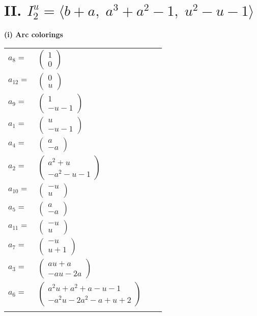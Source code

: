 \documentclass[1p]{elsarticle_modified}
\theoremstyle{definition}
\begin{document}
\centering \section*{II. $I^u_{2}= \langle b+a,\;a^3+a^2-1,\;u^2- u-1 \rangle$}
\flushleft \textbf{(i) Arc colorings}\\
\begin{tabular}{m{7pt} m{180pt} m{7pt} m{180pt} }
\flushright $a_{8}=$&$\begin{pmatrix}1\\0\end{pmatrix}$ \\
\flushright $a_{12}=$&$\begin{pmatrix}0\\u\end{pmatrix}$ \\
\flushright $a_{9}=$&$\begin{pmatrix}1\\- u-1\end{pmatrix}$ \\
\flushright $a_{1}=$&$\begin{pmatrix}u\\- u-1\end{pmatrix}$ \\
\flushright $a_{4}=$&$\begin{pmatrix}a\\- a\end{pmatrix}$ \\
\flushright $a_{2}=$&$\begin{pmatrix}a^2+u\\- a^2- u-1\end{pmatrix}$ \\
\flushright $a_{10}=$&$\begin{pmatrix}- u\\u\end{pmatrix}$ \\
\flushright $a_{5}=$&$\begin{pmatrix}a\\- a\end{pmatrix}$ \\
\flushright $a_{11}=$&$\begin{pmatrix}- u\\u\end{pmatrix}$ \\
\flushright $a_{7}=$&$\begin{pmatrix}- u\\u+1\end{pmatrix}$ \\
\flushright $a_{3}=$&$\begin{pmatrix}a u+a\\- a u-2 a\end{pmatrix}$ \\
\flushright $a_{6}=$&$\begin{pmatrix}a^2 u+a^2+a- u-1\\- a^2 u-2 a^2- a+u+2\end{pmatrix}$\\&\end{tabular}
\end{document}
